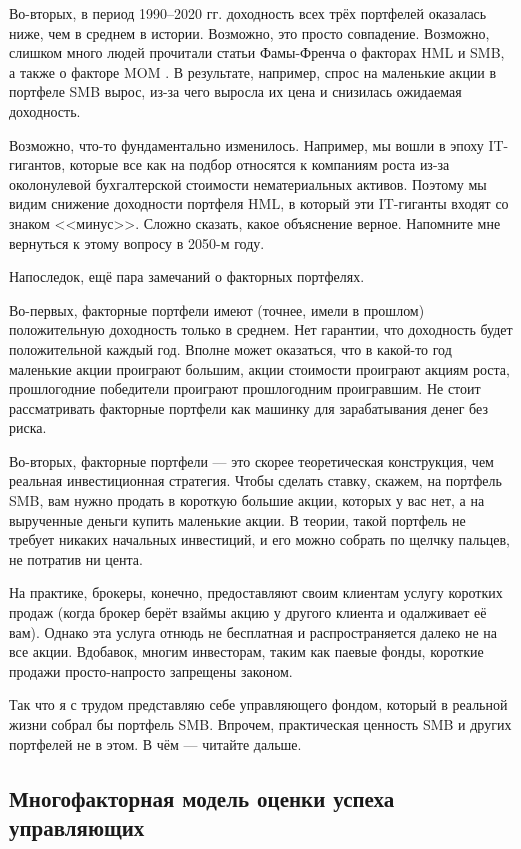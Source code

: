 Во-вторых, в период 1990--2020 гг. доходность всех трёх портфелей оказалась 
ниже, чем в среднем в истории. Возможно, это просто совпадение. Возможно, 
слишком много людей прочитали статьи Фамы-Френча о факторах HML и SMB, а также 
 о факторе MOM \cite{carhart1997persistence}. 
В результате, например, спрос на маленькие акции в портфеле SMB вырос, из-за 
чего выросла их цена и снизилась ожидаемая доходность.

Возможно, что-то фундаментально изменилось. Например, мы вошли в эпоху 
IT-гигантов, которые все как на подбор относятся к компаниям роста из-за 
околонулевой бухгалтерской стоимости нематериальных активов. Поэтому мы видим 
снижение доходности портфеля HML, в который эти IT-гиганты входят со знаком 
<<минус>>. Сложно сказать, какое объяснение верное. Напомните мне вернуться к 
этому вопросу в 2050-м году.

Напоследок, ещё пара замечаний о факторных портфелях.

Во-первых, факторные портфели имеют (точнее, имели в прошлом) положительную 
доходность только в среднем. Нет гарантии, что доходность будет положительной 
каждый год. Вполне может оказаться, что в какой-то год маленькие акции проиграют 
большим, акции стоимости проиграют акциям роста, прошлогодние победители 
проиграют прошлогодним проигравшим. Не стоит рассматривать факторные портфели 
как машинку для зарабатывания денег без риска.

Во-вторых, факторные портфели --- это скорее теоретическая конструкция, чем 
реальная инвестиционная стратегия. Чтобы сделать ставку, скажем, на портфель 
SMB, вам нужно продать в короткую большие акции, которых у вас нет, а на 
вырученные деньги купить маленькие акции. В теории, такой портфель не требует 
никаких начальных инвестиций, и его можно собрать по щелчку пальцев, не потратив 
ни цента.

На практике, брокеры, конечно, предоставляют своим клиентам ус\-лугу коротких 
продаж (когда брокер берёт взаймы акцию у другого клиента и одалживает её вам). 
Однако эта услуга отнюдь не бесплатная и распространяется далеко не на все 
акции. Вдобавок, многим инвесторам, таким как паевые фонды, короткие продажи 
просто-напросто запрещены законом.

Так что я с трудом представляю себе управляющего фондом, который в реальной 
жизни собрал бы портфель SMB. Впрочем, практическая ценность SMB и других 
портфелей не в этом. В чём --- читайте дальше.

\subsection{Многофакторная модель оценки успеха управляющих}


